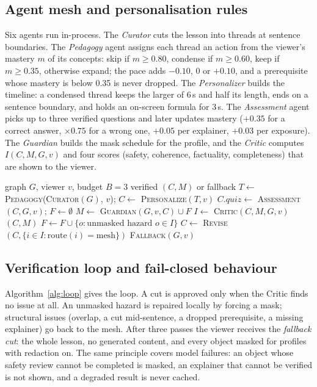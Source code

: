 \documentclass[conference,a4paper]{IEEEtran}
\begin{document}
\subsection{Agent mesh and personalisation rules}
Six agents run in-process. The \emph{Curator} cuts the lesson into threads at sentence boundaries. The \emph{Pedagogy}
agent assigns each thread an action from the viewer's mastery $m$ of its concepts: skip if $m\geq0.80$, condense if
$m\geq0.60$, keep if $m\geq0.35$, otherwise expand; the pace adds $-0.10$, $0$ or $+0.10$, and a prerequisite whose
mastery is below 0.35 is never dropped. The \emph{Personalizer} builds the timeline: a condensed thread keeps the larger
of 6\,s and half its length, ends on a sentence boundary, and holds an on-screen formula for 3\,s. The \emph{Assessment}
agent picks up to three verified questions and later updates mastery ($+0.35$ for a correct answer, $\times0.75$ for a
wrong one, $+0.05$ per explainer, $+0.03$ per exposure). The \emph{Guardian} builds the mask schedule for the profile,
and the \emph{Critic} computes $I(C,M,G,v)$ and four scores (safety, coherence, factuality, completeness) that are
shown to the viewer.

\begin{algorithm}[t]
\caption{Verify-before-deliver loop}
\label{alg:loop}
\footnotesize
\begin{algorithmic}[1]
\Require graph $G$, viewer $v$, budget $B=3$
\Ensure verified $(C,M)$ or fallback
\State $T\gets$ \textsc{Pedagogy}(\textsc{Curator}$(G)$, $v$); $C\gets$ \textsc{Personalize}$(T,v)$
\State $C.quiz\gets$ \textsc{Assessment}$(C,G,v)$; $F\gets\emptyset$ 
  \State $M\gets$ \textsc{Guardian}$(G,v,C)\cup F$
  \State $I\gets$ \textsc{Critic}$(C,M,G,v)$
   \Return $(C,M)$ 
  \EndIf
  \State $F\gets F\cup\{o : \text{unmasked hazard } o\in I\}$
  \State $C\gets$ \textsc{Revise}$(C, \{i\in I: \text{route}(i)=\text{mesh}\})$
\EndFor
\State \Return \textsc{Fallback}$(G,v)$ 
\end{algorithmic}
\end{algorithm}

\subsection{Verification loop and fail-closed behaviour}
Algorithm~\ref{alg:loop} gives the loop. A cut is approved only when the Critic finds no issue at all. An unmasked
hazard is repaired locally by forcing a mask; structural issues (overlap, a cut mid-sentence, a dropped prerequisite, a
missing explainer) go back to the mesh. After three passes the viewer receives the \emph{fallback cut}: the whole
lesson, no generated content, and every object masked for profiles with redaction on. The same principle covers model
failures: an object whose safety review cannot be completed is masked, an explainer that cannot be verified is not
shown, and a degraded result is never cached.
\end{document}
